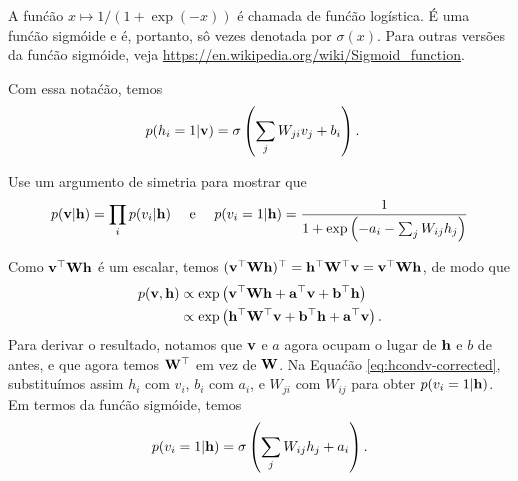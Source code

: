 \begin{exenumerate}
\begin{solution}
        A fun\'c\~ao $x \mapsto 1/(1+\exp(-x))$ \'e chamada de fun\'c\~ao log\'istica. \'E uma fun\'c\~ao sigm\'oide e \'e, portanto, s\^o vezes denotada por $\sigma(x)$.
        Para outras vers\~oes da fun\'c\~ao sigm\'oide, veja \url{https://en.wikipedia.org/wiki/Sigmoid_function}.
        \begin{center}
            \vspace{5ex}
            \vspace{2ex}
        \end{center}
        Com essa nota\'c\~ao, temos
        \begin{align*}
            p(h_i=1 | \mathbf{v}) &= \sigma\left(\sum_j W_{ji} v_j  + b_i\right).
        \end{align*}
        
    \end{solution}
    
    \item Use um argumento de simetria para mostrar que
    $$p(\mathbf{v} | \mathbf{h}) = \prod_i p(v_i | \mathbf{h}) \quad \text{ e }  \quad p(v_i = 1 | \mathbf{h}) = \frac{1}{1+\exp\left(-a_i-\sum_j W_{ij} h_j\right)}$$
    
    \begin{solution}
        Como $\mathbf{v}^\top \mathbf{W} \mathbf{h}$ \'e um escalar, temos $(\mathbf{v}^\top \mathbf{W} \mathbf{h})^\top = \mathbf{h}^\top \mathbf{W}^\top \mathbf{v} =  \mathbf{v}^\top \mathbf{W} \mathbf{h}$, de modo que
        \begin{align}
            p(\mathbf{v},\mathbf{h}) & \propto \exp\left( \mathbf{v}^\top \mathbf{W} \mathbf{h} + \mathbf{a}^\top\mathbf{v} + \mathbf{b}^\top\mathbf{h} \right) \\
            & \propto \exp\left( \mathbf{h}^\top \mathbf{W}^\top \mathbf{v} + \mathbf{b}^\top\mathbf{h} + \mathbf{a}^\top\mathbf{v}  \right).
        \end{align}
        Para derivar o resultado, notamos que $\mathbf{v}$ e $a$ agora ocupam o lugar de $\mathbf{h}$ e $b$ de antes, e que agora temos $\mathbf{W}^\top$ em vez de $\mathbf{W}$. Na Equa\'c\~ao \eqref{eq:hcondv-corrected}, substitu\'imos assim $h_i$ com $v_i$, $b_i$ com $a_i$, e $W_{ji}$ com $W_{ij}$ para obter $p(v_i = 1 | \mathbf{h})$. Em termos da fun\'c\~ao sigm\'oide, temos
        $$ p(v_i=1 | \mathbf{h}) = \sigma\left(\sum_j W_{ij} h_j + a_i\right).$$
        

\end{solution}
\end{exenumerate}
